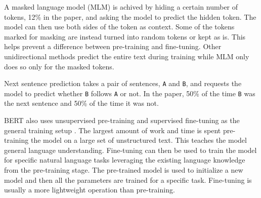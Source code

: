 \documentclass[twoside]{article}
\begin{document}
A masked language model (MLM) is achived by hiding a certain number of tokens, 12\% in the paper, and
asking the model to predict the hidden token. The model can then use both sides of the token as
context. Some of the tokens marked for masking are instead turned 
into random tokens or kept as is. This helps prevent a difference between pre-training and fine-tuning.
Other unidirectional methods predict the entire text during training while MLM only 
does so only for the masked tokens. \cite{devlin_bert_2019}

Next sentence prediction takes a pair of sentences, \texttt{A} and \texttt{B}, and requests the model
to predict whether \texttt{B} follows \texttt{A} or not. In the paper, 50\% of the time \texttt{B} 
was the next sentence and 50\% of the time it was not. \cite{devlin_bert_2019}

BERT also uses unsupervised pre-training and supervised fine-tuning as the general training setup \cite{devlin_bert_2019}.
The largest amount of work and time is spent pre-training the model on a large set of unstructured
text. This teaches the model general language understanding. Fine-tuning can then be used to 
train the model for specific natural language tasks leveraging the existing language knowledge 
from the pre-training stage. The pre-trained model is used to initialize a new model and 
then all the parameters are trained for a specific task. Fine-tuning is usually a more 
lightweight operation than pre-training. \cite{devlin_bert_2019}
\end{document}
